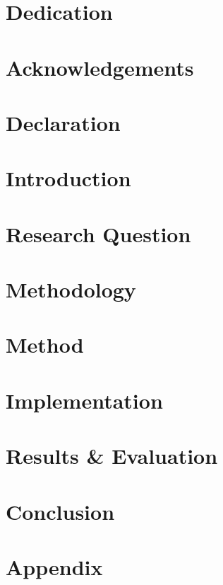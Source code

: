 \documentclass[a4paper,12pt]{report}
\begin{document}



\chapter*{Dedication}

\chapter*{Acknowledgements}

\chapter*{Declaration}


\tableofcontents
\listoffigures
\listoftables

\chapter{Introduction}

\chapter{Research Question}

\chapter{Methodology}

\chapter{Method}

\chapter{Implementation}

\chapter{Results \& Evaluation}

\chapter{Conclusion}


\appendix

\chapter{Appendix}


\printbibliography

\end{document}
